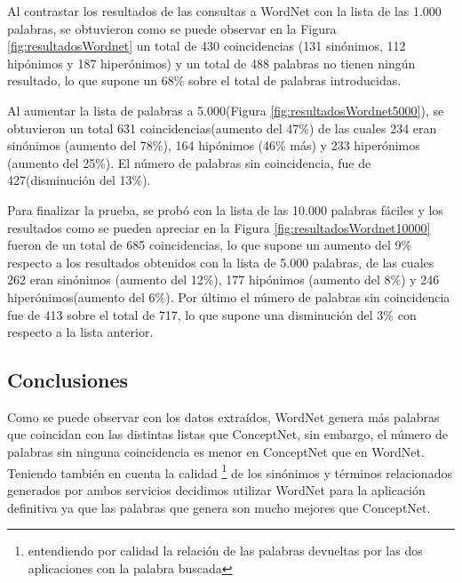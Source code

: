 Al contrastar los resultados de las consultas a WordNet con la lista de las 1.000 palabras, se obtuvieron como se puede observar en la Figura \ref{fig:resultadosWordnet} un total de 430 coincidencias (131 sinónimos, 112 hipónimos y 187 hiperónimos) y un total de 488 palabras no tienen ningún resultado, lo que supone un 68\% sobre el total de palabras introducidas.


Al aumentar la lista de palabras a 5.000(Figura \ref{fig:resultadosWordnet5000}), se obtuvieron un total 631 coincidencias(aumento del 47\%) de las cuales 234 eran sinónimos (aumento del 78\%), 164 hipónimos (46\% más) y 233 hiperónimos (aumento del 25\%). El número de palabras sin coincidencia, fue de 427(disminución del 13\%).


Para finalizar la prueba, se probó con la lista de las 10.000 palabras fáciles y los resultados como se pueden apreciar en la Figura \ref{fig:resultadosWordnet10000} fueron de un total de 685 coincidencias, lo que supone un aumento del 9\% respecto a los resultados obtenidos con la lista de 5.000 palabras, de las cuales 262 eran sinónimos (aumento del 12\%), 177 hipónimos (aumento del 8\%) y 246 hiperónimos(aumento del 6\%). Por último el número de palabras sin coincidencia fue de 413 sobre el total de 717, lo que supone una disminución del 3\% con respecto a la lista anterior.


\subsection{Conclusiones}
\label{cap:subsec:conclusionesPruebas}

Como se puede observar con los datos extraídos, WordNet genera más palabras que coincidan con las distintas listas que ConceptNet, sin embargo, el número de palabras sin ninguna coincidencia es menor en ConceptNet que en WordNet. Teniendo también en cuenta la calidad \footnote{entendiendo por calidad la relación de las palabras devueltas por las dos aplicaciones con la palabra buscada} de los sinónimos y términos relacionados generados por ambos servicios decidimos utilizar WordNet para la aplicación definitiva ya que las palabras que genera son mucho mejores que ConceptNet.